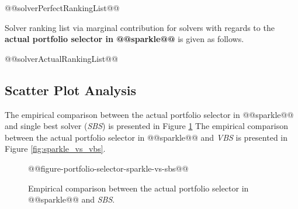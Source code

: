 \documentclass[british]{article}
\begin{document}
\begin{enumerate} 
@@solverPerfectRankingList@@
\end{enumerate}

Solver ranking list via marginal contribution \cite{XuEtAl12} for solvers with regards to the \textbf{actual portfolio selector in @@sparkle@@} is given as follows.

\begin{enumerate} 
@@solverActualRankingList@@
\end{enumerate}


\subsection{Scatter Plot Analysis}

The empirical comparison between the actual portfolio selector in @@sparkle@@ and single best solver (\emph{SBS}) is presented in Figure \ref{fig:sparkle_vs_sbs}
The empirical comparison between the actual portfolio selector in @@sparkle@@ and \emph{VBS} is presented in Figure \ref{fig:sparkle_vs_vbs}.


%

\begin{figure}[htbp]
\noindent \begin{centering}
@@figure-portfolio-selector-sparkle-vs-sbs@@
\par\end{centering}

\caption{Empirical comparison between the actual portfolio selector in @@sparkle@@ and \emph{SBS}.}\label{fig:sparkle_vs_sbs}
\end{figure}
\end{document}

